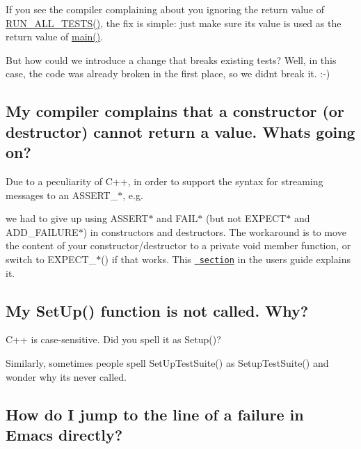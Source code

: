If you see the compiler complaining about you ignoring the return value of {\ttfamily \mbox{\hyperlink{googletest-master_2googletest_2include_2gtest_2gtest_8h_a853a3792807489591d3d4a2f2ff9359f}{R\+U\+N\+\_\+\+A\+L\+L\+\_\+\+T\+E\+S\+T\+S()}}}, the fix is simple\+: just make sure its value is used as the return value of {\ttfamily \mbox{\hyperlink{_be_01vektoriaus_2main_8cpp_ae66f6b31b5ad750f1fe042a706a4e3d4}{main()}}}.

But how could we introduce a change that breaks existing tests? Well, in this case, the code was already broken in the first place, so we didn\textquotesingle{}t break it. \+:-\/)

\subsection*{My compiler complains that a constructor (or destructor) cannot return a value. What\textquotesingle{}s going on?}

Due to a peculiarity of C++, in order to support the syntax for streaming messages to an {\ttfamily A\+S\+S\+E\+R\+T\+\_\+$\ast$}, e.\+g.


\begin{DoxyCode}{0}
\end{DoxyCode}


we had to give up using {\ttfamily A\+S\+S\+E\+R\+T$\ast$} and {\ttfamily F\+A\+I\+L$\ast$} (but not {\ttfamily E\+X\+P\+E\+C\+T$\ast$} and {\ttfamily A\+D\+D\+\_\+\+F\+A\+I\+L\+U\+R\+E$\ast$}) in constructors and destructors. The workaround is to move the content of your constructor/destructor to a private void member function, or switch to {\ttfamily E\+X\+P\+E\+C\+T\+\_\+$\ast$()} if that works. This \href{advanced.md\#assertion-placement}{\texttt{ section}} in the user\textquotesingle{}s guide explains it.

\subsection*{My Set\+Up() function is not called. Why?}

C++ is case-\/sensitive. Did you spell it as {\ttfamily Setup()}?

Similarly, sometimes people spell {\ttfamily Set\+Up\+Test\+Suite()} as {\ttfamily Setup\+Test\+Suite()} and wonder why it\textquotesingle{}s never called.

\subsection*{How do I jump to the line of a failure in Emacs directly?}

